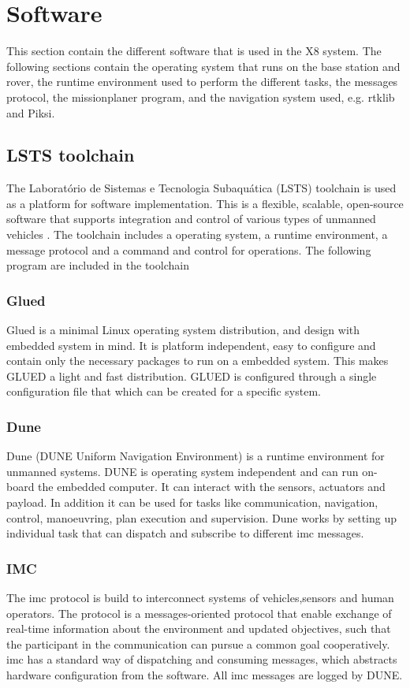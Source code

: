 \section{Software}\label{S:software}
This section contain the different software that is used in the X8 system. The following sections contain the operating system that runs on the base station and rover, the runtime environment used to perform the different tasks, the messages protocol, the missionplaner program, and the navigation system used, e.g. \gls{rtklib} and Piksi.
\subsection{LSTS toolchain}
The Laboratório de Sistemas e Tecnologia Subaquática (LSTS) toolchain is used as a platform for software implementation. This is a flexible, scalable, open-source software that supports integration and control of various types of unmanned vehicles \citep{pinto2013lsts}. The toolchain includes a operating system, a runtime environment, a message protocol and a command and control for operations. The following program are included in the toolchain
\subsubsection{Glued}
Glued is a minimal Linux operating system distribution, and design with embedded system in mind. It is platform independent, easy to configure and contain only the necessary packages to run on a embedded system. This makes GLUED a light and fast distribution. GLUED is configured through a single configuration file that which can be created for a specific system. 
\subsubsection{Dune}
Dune (DUNE Uniform Navigation Environment) is a runtime environment for unmanned systems. DUNE is operating system independent and can run on-board the embedded computer. It can interact with the sensors, actuators and payload. In addition it can be used for tasks like communication, navigation, control, manoeuvring, plan execution and supervision.
Dune works by setting up individual task that can dispatch and subscribe to different \gls{imc} messages.
\subsubsection{IMC}\label{ss:IMC}
The \acrfull{imc} protocol is build to interconnect systems of vehicles,sensors and human operators. The protocol is a messages-oriented protocol that enable exchange of real-time information about the environment and updated objectives, such that the participant in the communication can pursue a common goal cooperatively.
\gls{imc} has a standard way of dispatching and consuming messages, which abstracts hardware configuration from the software. All \gls{imc} messages are logged by DUNE.

